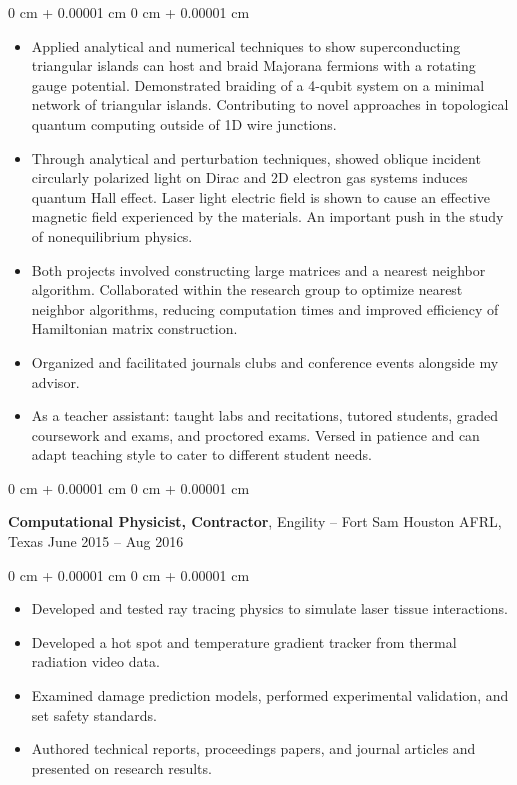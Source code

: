 \documentclass[10pt, letterpaper]{article}
\newenvironment{highlights}{
    \begin{itemize}[
        topsep=0.10 cm,
        parsep=0.10 cm,
        partopsep=0pt,
        itemsep=0pt,
        leftmargin=0 cm + 10pt
    ]
}{
    \end{itemize}
} %
\newenvironment{onecolentry}{
    \begin{adjustwidth}{
        0 cm + 0.00001 cm
    }{
        0 cm + 0.00001 cm
    }
}{
    \end{adjustwidth}
} %
\newenvironment{twocolentry}[2][]{
    \onecolentry
    \def\secondColumn{#2}
    \setcolumnwidth{\fill, 4.5 cm}
    \begin{paracol}{2}
}{
    \switchcolumn \raggedleft \secondColumn
    \end{paracol}
    \endonecolentry
} %
\begin{document}
        \vspace{0.10 cm}
        \begin{onecolentry}
            \begin{highlights}
            \item Applied analytical and numerical techniques to show superconducting triangular islands can host and braid Majorana fermions with a rotating gauge potential. Demonstrated braiding of a 4-qubit system on a minimal network of triangular islands. Contributing to novel approaches in topological quantum computing outside of 1D wire junctions.
            \item Through analytical and perturbation techniques, showed oblique incident circularly polarized light on Dirac and 2D electron gas systems induces quantum Hall effect. Laser light electric field is shown to cause an effective magnetic field experienced by the materials. An important push in the study of nonequilibrium physics.
            \item Both projects involved constructing large matrices and a nearest neighbor algorithm. Collaborated within the research group to optimize nearest neighbor algorithms, reducing computation times and improved efficiency of Hamiltonian matrix construction.
            \item Organized and facilitated journals clubs and conference events alongside my advisor.
            \item As a teacher assistant: taught labs and recitations, tutored students, graded coursework and exams, and proctored exams. Versed in patience and can adapt teaching style to cater to different student needs.
            \end{highlights}
        \end{onecolentry}

        \vspace{0.2 cm}

        \begin{twocolentry}{
            June 2015 – Aug 2016
        }
      \textbf{Computational Physicist, Contractor}, Engility -- Fort Sam Houston AFRL, Texas\end{twocolentry}

        \vspace{0.10 cm}
        \begin{onecolentry}
            \begin{highlights}
              \item Developed and tested ray tracing physics to simulate laser tissue interactions.
              \item Developed a hot spot and temperature gradient tracker from thermal radiation video data.
              \item Examined damage prediction models, performed experimental validation, and set safety standards.
              \item Authored technical reports, proceedings papers, and journal articles and presented on research results.
            \end{highlights}
        \end{onecolentry}
\end{document}

